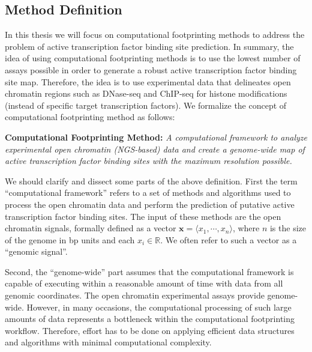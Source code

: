 \subsection{Method Definition}
\label{sec:method.definition}

In this thesis we will focus on computational footprinting methods to address the problem of active transcription factor binding site prediction. In summary, the idea of using computational footprinting methods is to use the lowest number of assays possible in order to generate a robust active transcription factor binding site map. Therefore, the idea is to use experimental data that delineates open chromatin regions such as DNase-seq and ChIP-seq for histone modifications (instead of specific target transcription factors). We formalize the concept of computational footprinting method as follows:

\vspace{0.5cm}
\noindent
\textbf{Computational Footprinting Method:} \emph{A computational framework to analyze experimental open chromatin (NGS-based) data and create a genome-wide map of active transcription factor binding sites with the maximum resolution possible.}
\vspace{0.45cm}

We should clarify and dissect some parts of the above definition. First the term ``computational framework'' refers to a set of methods and algorithms used to process the open chromatin data and perform the prediction of putative active transcription factor binding sites. The input of these methods are the open chromatin signals, formally defined as a vector $\mathbf{x} = \langle x_1, \cdots, x_n \rangle$, where $n$ is the size of the genome in bp units and each $x_i \in \mathbb{R}$. We often refer to such a vector as a ``genomic signal''.

Second, the ``genome-wide'' part assumes that the computational framework is capable of executing within a reasonable amount of time with data from all genomic coordinates. The open chromatin experimental assays provide genome-wide. However, in many occasions, the computational processing of such large amounts of data represents a bottleneck within the computational footprinting workflow. Therefore, effort has to be done on applying efficient data structures and algorithms with minimal computational complexity.

